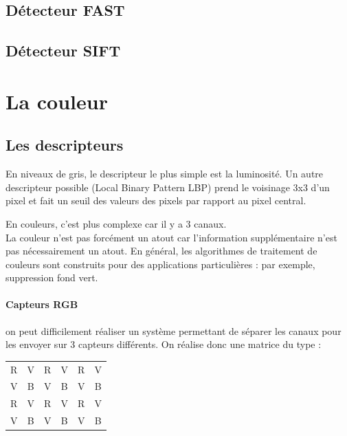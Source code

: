 \documentclass[main.tex]{subfiles}
\begin{document}
\subsection{Détecteur FAST}
\subsection{Détecteur SIFT}





\section{La couleur}

\subsection{Les descripteurs}

En niveaux de gris, le descripteur le plus simple est la luminosité. Un autre descripteur possible (Local Binary Pattern LBP) prend le voisinage 3x3 d'un pixel et fait un seuil des valeurs des pixels par rapport au pixel central.

En couleurs, c'est plus complexe car il y a 3 canaux.\\

La couleur n'est pas forcément un atout car l'information supplémentaire n'est pas nécessairement un atout. En général, les algorithmes de traitement de couleurs sont construits pour des applications particulières : par exemple, suppression fond vert.\\

\paragraph{Capteurs RGB} on peut difficilement réaliser un système permettant de séparer les canaux pour les envoyer sur 3 capteurs différents. On réalise donc une matrice du type :

\begin{center}
\begin{tabular}{cccccc}
R & V & R & V & R & V \\
V & B & V & B & V & B \\
R & V & R & V & R & V \\
V & B & V & B & V & B \\
\end{tabular}
\end{center}
\end{document}
